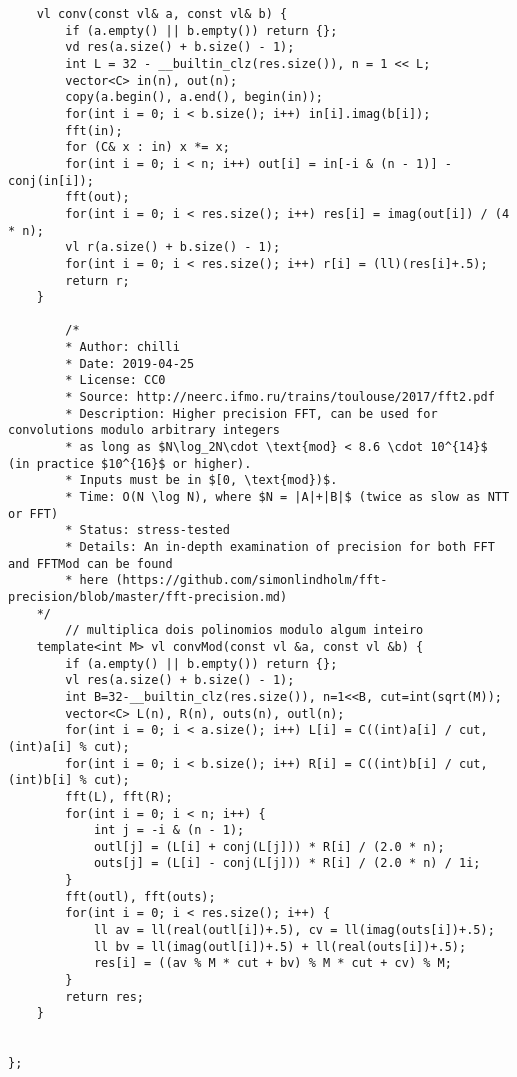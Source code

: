 \documentclass[11pt, a4paper, twoside]{article}
\begin{document}
\begin{verbatim}
    vl conv(const vl& a, const vl& b) {
        if (a.empty() || b.empty()) return {};
        vd res(a.size() + b.size() - 1);
        int L = 32 - __builtin_clz(res.size()), n = 1 << L;
        vector<C> in(n), out(n);
        copy(a.begin(), a.end(), begin(in));
        for(int i = 0; i < b.size(); i++) in[i].imag(b[i]);
        fft(in);
        for (C& x : in) x *= x;
        for(int i = 0; i < n; i++) out[i] = in[-i & (n - 1)] - conj(in[i]);
        fft(out);
        for(int i = 0; i < res.size(); i++) res[i] = imag(out[i]) / (4 * n);
        vl r(a.size() + b.size() - 1);
        for(int i = 0; i < res.size(); i++) r[i] = (ll)(res[i]+.5);
        return r;
    }
     
        /*
        * Author: chilli
        * Date: 2019-04-25
        * License: CC0
        * Source: http://neerc.ifmo.ru/trains/toulouse/2017/fft2.pdf
        * Description: Higher precision FFT, can be used for convolutions modulo arbitrary integers
        * as long as $N\log_2N\cdot \text{mod} < 8.6 \cdot 10^{14}$ (in practice $10^{16}$ or higher).
        * Inputs must be in $[0, \text{mod})$.
        * Time: O(N \log N), where $N = |A|+|B|$ (twice as slow as NTT or FFT)
        * Status: stress-tested
        * Details: An in-depth examination of precision for both FFT and FFTMod can be found
        * here (https://github.com/simonlindholm/fft-precision/blob/master/fft-precision.md)
    */
        // multiplica dois polinomios modulo algum inteiro
    template<int M> vl convMod(const vl &a, const vl &b) {
        if (a.empty() || b.empty()) return {};
        vl res(a.size() + b.size() - 1);
        int B=32-__builtin_clz(res.size()), n=1<<B, cut=int(sqrt(M));
        vector<C> L(n), R(n), outs(n), outl(n);
        for(int i = 0; i < a.size(); i++) L[i] = C((int)a[i] / cut, (int)a[i] % cut);
        for(int i = 0; i < b.size(); i++) R[i] = C((int)b[i] / cut, (int)b[i] % cut);
        fft(L), fft(R);
        for(int i = 0; i < n; i++) {
            int j = -i & (n - 1);
            outl[j] = (L[i] + conj(L[j])) * R[i] / (2.0 * n);
            outs[j] = (L[i] - conj(L[j])) * R[i] / (2.0 * n) / 1i;
        }
        fft(outl), fft(outs);
        for(int i = 0; i < res.size(); i++) {
            ll av = ll(real(outl[i])+.5), cv = ll(imag(outs[i])+.5);
            ll bv = ll(imag(outl[i])+.5) + ll(real(outs[i])+.5);
            res[i] = ((av % M * cut + bv) % M * cut + cv) % M;
        }
        return res;
    }
     
    
};
\end{verbatim}
\end{document}
